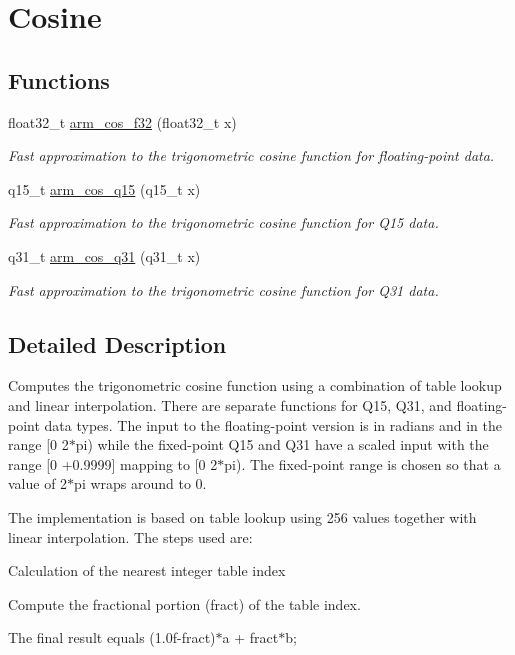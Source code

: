 \hypertarget{group__cos}{}\section{Cosine}
\label{group__cos}
\subsection*{Functions}
\begin{DoxyCompactItemize}
\item 
float32\+\_\+t \hyperlink{group__cos_gace15287f9c64b9b4084d1c797d4c49d8}{arm\+\_\+cos\+\_\+f32} (float32\+\_\+t x)
\begin{DoxyCompactList}\small\item\em Fast approximation to the trigonometric cosine function for floating-\/point data. \end{DoxyCompactList}\item 
q15\+\_\+t \hyperlink{group__cos_gadfd60c24def501638c0d5db20f4c869b}{arm\+\_\+cos\+\_\+q15} (q15\+\_\+t x)
\begin{DoxyCompactList}\small\item\em Fast approximation to the trigonometric cosine function for Q15 data. \end{DoxyCompactList}\item 
q31\+\_\+t \hyperlink{group__cos_gad80f121949ef885a77d83ab36e002567}{arm\+\_\+cos\+\_\+q31} (q31\+\_\+t x)
\begin{DoxyCompactList}\small\item\em Fast approximation to the trigonometric cosine function for Q31 data. \end{DoxyCompactList}\end{DoxyCompactItemize}


\subsection{Detailed Description}
Computes the trigonometric cosine function using a combination of table lookup and linear interpolation. There are separate functions for Q15, Q31, and floating-\/point data types. The input to the floating-\/point version is in radians and in the range \mbox{[}0 2$\ast$pi) while the fixed-\/point Q15 and Q31 have a scaled input with the range \mbox{[}0 +0.9999\mbox{]} mapping to \mbox{[}0 2$\ast$pi). The fixed-\/point range is chosen so that a value of 2$\ast$pi wraps around to 0.

The implementation is based on table lookup using 256 values together with linear interpolation. The steps used are\+:
\begin{DoxyEnumerate}
\item Calculation of the nearest integer table index
\item Compute the fractional portion (fract) of the table index.
\item The final result equals {\ttfamily (1.\+0f-\/fract)$\ast$a + fract$\ast$b;}
\end{DoxyEnumerate}

